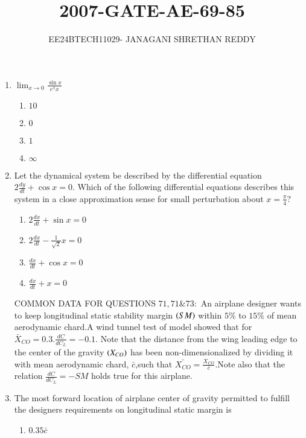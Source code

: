 \documentclass[journal]{IEEEtran}
\begin{document}
 


\vspace{3cm}

\title{2007-GATE-AE-69-85}
\author{EE24BTECH11029- JANAGANI SHRETHAN REDDY}
\maketitle{}
\bigskip
\renewcommand{\thefigure}{\theenumi}
\renewcommand{\thetable}{\theenum}
\begin{enumerate}
    \item $\lim_{x \to 0}\frac{\sin x}{e^x x}$
    \begin{enumerate}
        \item $10$
        \item $0$
        \item $1$
        \item $\infty$
    \end{enumerate}
    \item Let the dynamical system be described by the differential equation $2\frac{dy}{dt}+\cos x=0.$ Which of the following differential equations describes this system in a close approximation sense for small perturbation about $x=\frac{\pi}{4}?$
    \begin{enumerate}
        \item $2\frac{dx}{dt}+\sin x=0$
        \item $2\frac{dx}{dt}-\frac{1}{\sqrt{2}}x=0$
        \item $\frac{dx}{dt}+\cos x=0$
        \item $\frac{dx}{dt}+x=0$
    \end{enumerate}
    COMMON DATA FOR QUESTIONS $71,71\&73:$ An airplane designer wants to keep longitudinal static stability margin $\left(SM\right)$ within $5\%$ to $15\%$ of mean aerodynamic chard.A wind tunnel test of model showed that for $\bar{X}_{CO}=0.3.\frac{dC}{dC_L}=-0.1.$ Note that the distance from the wing leading edge to the center of the gravity $\left(X_{CO}\right)$ has been non-dimensionalized by dividing it with mean aerodynamic chard, $\bar{c}$,such that $\bar{X_{CO}}=\frac{X_{CO}}{\bar{c}}$.Note also that the relation $\frac{dC}{dC_L}=-SM$ holds true for this airplane.
    \item The most forward location of airplane center of gravity permitted to fulfill the designers requirements on longitudinal static margin is
    \begin{enumerate}
        \item $0.35\bar{c}$

\end{enumerate}
\end{enumerate}
\end{document}
